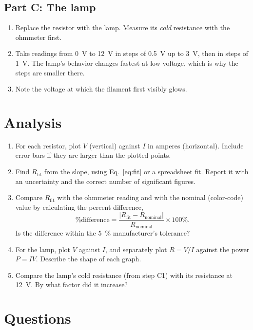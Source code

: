 \documentclass[11pt]{article}
\begin{document}
\subsection*{Part C: The lamp}

\begin{enumerate}[label=C\arabic*.]
  \item Replace the resistor with the lamp. Measure its \emph{cold} resistance with the ohmmeter first.
  \item Take readings from \SI{0}{\volt} to \SI{12}{\volt} in steps of \SI{0.5}{\volt} up to \SI{3}{\volt}, then in steps of \SI{1}{\volt}. The lamp's behavior changes fastest at low voltage, which is why the steps are smaller there.
  \item Note the voltage at which the filament first visibly glows.
\end{enumerate}

\section{Analysis}

\begin{enumerate}[label=\arabic*.]
  \item For each resistor, plot $V$ (vertical) against $I$ in amperes (horizontal). Include error bars if they are larger than the plotted points.
  \item Find $R_\text{fit}$ from the slope, using Eq.~\eqref{eq:fit} or a spreadsheet fit. Report it with an uncertainty and the correct number of significant figures.
  \item Compare $R_\text{fit}$ with the ohmmeter reading and with the nominal (color-code) value by calculating the percent difference,
  \[
    \text{\% difference} = \frac{\lvert R_\text{fit} - R_\text{nominal} \rvert}{R_\text{nominal}} \times 100\%.
  \]
  Is the difference within the \SI{5}{\percent} manufacturer's tolerance?
  \item For the lamp, plot $V$ against $I$, and separately plot $R = V/I$ against the power $P = IV$. Describe the shape of each graph.
  \item Compare the lamp's cold resistance (from step C1) with its resistance at \SI{12}{\volt}. By what factor did it increase?
\end{enumerate}

\section{Questions}
\end{document}
